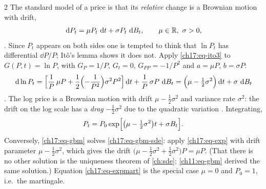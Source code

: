 \begin{paracol}{2}
The standard model of a price is that its \emph{relative} change is a Brownian motion with drift,
\begin{equation}\label{ch17:eq-gbm-sde}
  \dd P_t=\mu P_t\,\dd t+\sigma P_t\,\dd B_t,\qquad \mu\in\R,\ \sigma>0,
\end{equation}
. Since $P_t$ appears on both sides one is tempted to think that $\ln P_t$ has differential $\dd P/P$; It\^o's lemma shows it does not. Apply \eqref{ch17:eq-ito3} to
$G(P,t)=\ln P$, with $G_P=1/P$, $G_t=0$, $G_{PP}=-1/P^2$ and $a=\mu P$, $b=\sigma P$:
\begin{equation}\label{ch17:eq-logp}
  \,\mathrm{d}\ln P_t=\Bigl[\frac1P\,\mu P+\frac12\Bigl(-\frac1{P^2}\Bigr)\sigma^2P^2\Bigr]\,\mathrm{d} t+\frac1P\,\sigma P\,\,\mathrm{d} B_t=\Bigl(\mu-\tfrac12\sigma^2\Bigr)\,\mathrm{d} t+\sigma\,\,\mathrm{d} B_t
\end{equation}
. The log price is a Brownian motion with drift $\mu-\tfrac12\sigma^2$ and variance rate $\sigma^2$: the drift on the log scale has a \emph{drag} $-\tfrac12\sigma^2$ due to the quadratic variation
. Integrating,
\begin{equation}\label{ch17:eq-gbm}
  P_t=P_0\exp\Bigl[\bigl(\mu-\tfrac12\sigma^2\bigr)t+\sigma B_t\Bigr].
\end{equation}
Conversely, \eqref{ch17:eq-gbm} solves \eqref{ch17:eq-gbm-sde}: apply \eqref{ch17:eq-exp} with drift parameter $\mu-\tfrac12\sigma^2$, which gives the drift $\bigl(\mu-\tfrac12\sigma^2+\tfrac12\sigma^2\bigr)P=\mu P$. (That there is no other solution is the uniqueness theorem of \cref{ch:sde}; \cref{ch11:eq-gbm} derived the same solution.)
Equation \eqref{ch17:eq-expmart} is the special case $\mu=0$ and $P_0=1$, i.e.\ the martingale.


\end{paracol}
